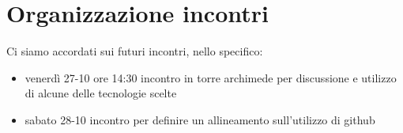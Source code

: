 \documentclass[12pt,a4paper]{article}
\begin{document}
\section{Organizzazione incontri}
Ci siamo accordati sui futuri incontri, nello specifico:
\begin{itemize}
    \item venerdì 27-10 ore 14:30 incontro in torre archimede per discussione e utilizzo di alcune delle tecnologie scelte
    \item sabato 28-10 incontro per definire un allineamento sull'utilizzo di github
\end{itemize} 
\end{document}
